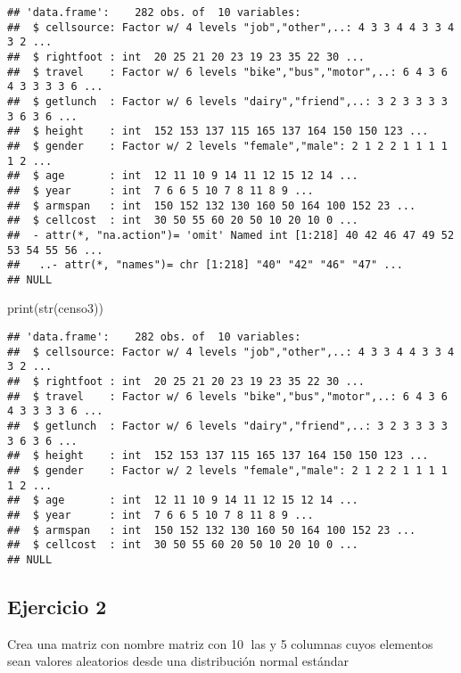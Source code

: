 \documentclass[
]{article}
\newenvironment{Shaded}{\begin{snugshade}}{\end{snugshade}}
\newcommand{\FunctionTok}[1]{\textcolor[rgb]{0.00,0.00,0.00}{#1}}
\newcommand{\NormalTok}[1]{#1}
\begin{document}
\begin{verbatim}
## 'data.frame':    282 obs. of  10 variables:
##  $ cellsource: Factor w/ 4 levels "job","other",..: 4 3 3 4 4 3 3 4 3 2 ...
##  $ rightfoot : int  20 25 21 20 23 19 23 35 22 30 ...
##  $ travel    : Factor w/ 6 levels "bike","bus","motor",..: 6 4 3 6 4 3 3 3 3 6 ...
##  $ getlunch  : Factor w/ 6 levels "dairy","friend",..: 3 2 3 3 3 3 3 6 3 6 ...
##  $ height    : int  152 153 137 115 165 137 164 150 150 123 ...
##  $ gender    : Factor w/ 2 levels "female","male": 2 1 2 2 1 1 1 1 1 2 ...
##  $ age       : int  12 11 10 9 14 11 12 15 12 14 ...
##  $ year      : int  7 6 6 5 10 7 8 11 8 9 ...
##  $ armspan   : int  150 152 132 130 160 50 164 100 152 23 ...
##  $ cellcost  : int  30 50 55 60 20 50 10 20 10 0 ...
##  - attr(*, "na.action")= 'omit' Named int [1:218] 40 42 46 47 49 52 53 54 55 56 ...
##   ..- attr(*, "names")= chr [1:218] "40" "42" "46" "47" ...
## NULL
\end{verbatim}

\begin{Shaded}
\begin{Highlighting}[]
\FunctionTok{print}\NormalTok{(}\FunctionTok{str}\NormalTok{(censo3))}
\end{Highlighting}
\end{Shaded}

\begin{verbatim}
## 'data.frame':    282 obs. of  10 variables:
##  $ cellsource: Factor w/ 4 levels "job","other",..: 4 3 3 4 4 3 3 4 3 2 ...
##  $ rightfoot : int  20 25 21 20 23 19 23 35 22 30 ...
##  $ travel    : Factor w/ 6 levels "bike","bus","motor",..: 6 4 3 6 4 3 3 3 3 6 ...
##  $ getlunch  : Factor w/ 6 levels "dairy","friend",..: 3 2 3 3 3 3 3 6 3 6 ...
##  $ height    : int  152 153 137 115 165 137 164 150 150 123 ...
##  $ gender    : Factor w/ 2 levels "female","male": 2 1 2 2 1 1 1 1 1 2 ...
##  $ age       : int  12 11 10 9 14 11 12 15 12 14 ...
##  $ year      : int  7 6 6 5 10 7 8 11 8 9 ...
##  $ armspan   : int  150 152 132 130 160 50 164 100 152 23 ...
##  $ cellcost  : int  30 50 55 60 20 50 10 20 10 0 ...
## NULL
\end{verbatim}

\hypertarget{ejercicio-2}{%
\subsection{Ejercicio 2}\label{ejercicio-2}}

Crea una matriz con nombre matriz con 10 las y 5 columnas cuyos
elementos sean valores aleatorios desde una distribución normal estándar
\end{document}

